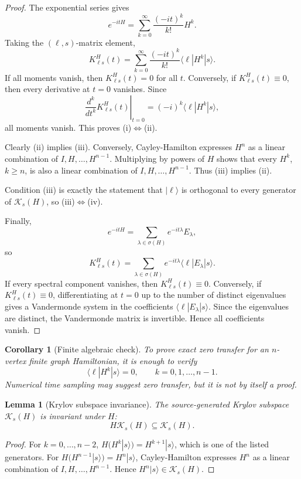 \documentclass[11pt]{article}
\newtheorem{lemma}[theorem]{Lemma}
\newtheorem{corollary}[theorem]{Corollary}
\theoremstyle{definition}
\newcommand{\cK}{\mathcal K}
\begin{document}
\begin{proof}
The exponential series gives
\[
e^{-itH}=\sum_{k=0}^\infty \frac{(-it)^k}{k!}H^k.
\]
Taking the $(\ell,s)$-matrix element,
\[
K^H_{\ell s}(t)=\sum_{k=0}^\infty \frac{(-it)^k}{k!}\langle \ell|H^k|s\rangle.
\]
If all moments vanish, then $K^H_{\ell s}(t)=0$ for all $t$. Conversely, if $K^H_{\ell s}(t)\equiv0$, then every derivative at $t=0$ vanishes. Since
\[
\left.\frac{d^k}{dt^k}K^H_{\ell s}(t)\right|_{t=0}=(-i)^k\langle \ell|H^k|s\rangle,
\]
all moments vanish. This proves (i)$\Leftrightarrow$(ii).

Clearly (ii) implies (iii). Conversely, Cayley-Hamilton expresses $H^n$ as a linear combination of $I,H,\ldots,H^{n-1}$. Multiplying by powers of $H$ shows that every $H^k$, $k\ge n$, is also a linear combination of $I,H,\ldots,H^{n-1}$. Thus (iii) implies (ii).

Condition (iii) is exactly the statement that $|\ell\rangle$ is orthogonal to every generator of $\cK_s(H)$, so (iii)$\Leftrightarrow$(iv).

Finally,
\[
e^{-itH}=\sum_{\lambda\in\sigma(H)}e^{-it\lambda}E_\lambda,
\]
so
\[
K^H_{\ell s}(t)=\sum_{\lambda\in\sigma(H)}e^{-it\lambda}\langle \ell|E_\lambda|s\rangle.
\]
If every spectral component vanishes, then $K^H_{\ell s}(t)\equiv0$. Conversely, if $K^H_{\ell s}(t)\equiv0$, differentiating at $t=0$ up to the number of distinct eigenvalues gives a Vandermonde system in the coefficients $\langle \ell|E_\lambda|s\rangle$. Since the eigenvalues are distinct, the Vandermonde matrix is invertible. Hence all coefficients vanish.
\end{proof}

\begin{corollary}[Finite algebraic check]
To prove exact zero transfer for an $n$-vertex finite graph Hamiltonian, it is enough to verify
\[
\langle \ell|H^k|s\rangle=0,
\qquad k=0,1,\ldots,n-1.
\]
Numerical time sampling may suggest zero transfer, but it is not by itself a proof.
\end{corollary}

\begin{lemma}[Krylov subspace invariance]
The source-generated Krylov subspace $\cK_s(H)$ is invariant under $H$:
\[
H\cK_s(H)\subseteq \cK_s(H).
\]
\end{lemma}

\begin{proof}
For $k=0,\ldots,n-2$, $H(H^k|s\rangle)=H^{k+1}|s\rangle$, which is one of the listed generators. For $H(H^{n-1}|s\rangle)=H^n|s\rangle$, Cayley-Hamilton expresses $H^n$ as a linear combination of $I,H,\ldots,H^{n-1}$. Hence $H^n|s\rangle\in\cK_s(H)$.
\end{proof}
\end{document}
